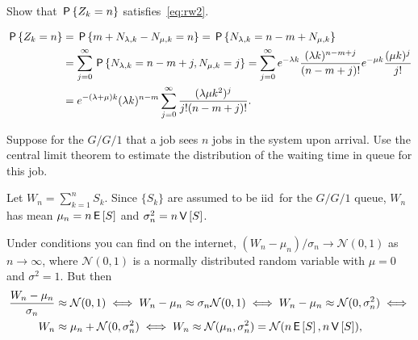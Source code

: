 \begin{exercise}\label{ex:l-134}
 Show that $\P{Z_k=n}$ satisfies~\cref{eq:rw2}.
\begin{solution}
\begin{align*}
 \P{Z_k=n}
&= \P{m+N_{\lambda, k } - N_{\mu, k} = n }
= \P{N_{\lambda, k} = n - m + N_{\mu, k}} \\
&= \sum_{j=0}^\infty \P{N_{\lambda, k}  =  n - m + j, N_{\mu, k} =j}
= \sum_{j=0}^\infty e^{-\lambda k} \frac{(\lambda k )^{n - m + j}}{(n-m+j)!} e^{-\mu k} \frac{(\mu k )^j}{j!} \\
&= e^{-(\lambda+\mu)k} (\lambda k)^{n-m} \sum_{j=0}^\infty  \frac{(\lambda\mu k^2)^j} {j!(n-m+j)!}.
\end{align*}
\end{solution}
\end{exercise}




\begin{exercise}\label{ex:l-147}
 Suppose
 for the $G/G/1$ that a job sees $n$ jobs in the system upon arrival.
 Use the central limit theorem to estimate the distribution of the waiting time in queue for this job.
\begin{hint}
 Let $W_{n} = \sum_{k=1}^n S_k$.
 Since $\{S_k\}$ are assumed to be iid\ for the $G/G/1$ queue, $W_{n}$ has mean $\mu_n = n \E S$ and $\sigma_n^2 = n\V S$.
\end{hint}
\begin{solution} Under conditions you can find on the internet, $(W_{n} - \mu_n)/\sigma_n \to \mathcal{N}(0,1)$ as $n\to \infty$,
 where $\mathcal{N}(0,1)$ is a normally distributed random variable
 with $\mu=0$ and $\sigma^2=1$. But then
 \begin{align*}
 \frac{\W_{n} - \mu_n}{\sigma_n} &\approx \mathcal{N}(0,1) \iff  W_{n} - \mu_n \approx \sigma_n \mathcal{N}(0,1) \iff
 W_{n} - \mu_n \approx \mathcal{N}(0,\sigma_n^2) \iff \\
 W_{n} &\approx \mu_n + \mathcal{N}(0,\sigma_n^2) \iff
 W_{n} \approx \mathcal{N}(\mu_n,\sigma_n^2) = \mathcal{N}(n\E S, n \V S),
 \end{align*}
\end{solution}
\end{exercise}




